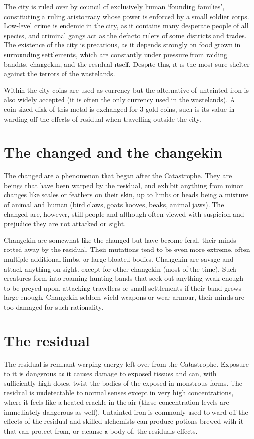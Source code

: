 \documentclass[a4paper,11pt,oneside]{book}
\begin{document}
The city is ruled over by council of exclusively human `founding families', constituting a ruling aristocracy whose power is enforced by a small soldier corps. Low-level crime is endemic in the city, as it contains many desperate people of all species, and criminal gangs act as the defacto rulers of some districts and trades. The existence of the city is precarious, as it depends strongly on food grown in surrounding settlements, which are constantly under pressure from raiding bandits, changekin, and the residual itself. Despite this, it is the most sure shelter against the terrors of the wastelands.

Within the city coins are used as currency but the alternative of untainted iron is also widely accepted (it is often the only currency used in the wastelands). A coin-sized disk of this metal is exchanged for 3 gold coins, such is its value in warding off the effects of residual when travelling outside the city.   

\section{The changed and the changekin}  
The changed are a phenomenon that began after the Catastrophe. They are beings that have been warped by the residual, and exhibit anything from minor changes like scales or feathers on their skin, up to limbs or heads being a mixture of animal and human (bird claws, goats hooves, beaks, animal jaws). The changed are, however, still people and although often viewed with suspicion and prejudice they are not attacked on sight. 

Changekin are somewhat like the changed but have become feral, their minds rotted away by the residual. Their mutations tend to be even more extreme, often multiple additional limbs, or large bloated bodies. Changekin are savage and attack anything on sight, except for other changekin (most of the time). Such creatures form into roaming hunting bands that seek out anything weak enough to be preyed upon, attacking travellers or small settlements if their band grows large enough. Changekin seldom wield weapons or wear armour, their minds are too damaged for such rationality.  


\section{The residual}
The residual is remnant warping energy left over from the Catastrophe. Exposure to it is dangerous as it causes damage to exposed tissues and can, with sufficiently high doses, twist the bodies of the exposed in monstrous forms. The residual is undetectable to normal senses except in very high concentrations, where it feels like a heated crackle in the air (these concentration levels are immediately dangerous as well). Untainted iron is commonly used to ward off the effects of the residual and skilled alchemists can produce potions brewed with it that can protect from, or cleanse a body of, the residuals effects. 
\end{document}
